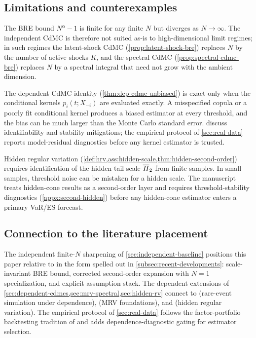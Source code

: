 \subsection{Limitations and counterexamples}
\label{subsec:limitations}

The BRE bound $N^\alpha-1$ is finite for any finite $N$ but diverges as
$N\to\infty$. The independent CdMC is therefore not suited as-is to
high-dimensional limit regimes; in such regimes the latent-shock CdMC
(\cref{prop:latent-shock-bre}) replaces $N$ by the number of active shocks
$K$, and the spectral CdMC (\cref{prop:spectral-cdmc-bre}) replaces $N$ by a
spectral integral that need not grow with the ambient dimension.

The dependent CdMC identity (\cref{thm:dep-cdmc-unbiased}) is exact only when
the conditional kernels $p_i(t;X_{-i})$ are evaluated exactly. A
misspecified copula or a poorly fit conditional kernel produces a biased
estimator at every threshold, and the bias can be much larger than the Monte
Carlo standard error. 
discuss identifiability and stability mitigations; the empirical protocol of
\cref{sec:real-data} reports model-residual diagnostics before any kernel
estimator is trusted.

Hidden regular variation
(\cref{def:hrv,ass:hidden-scale,thm:hidden-second-order}) requires
identification of the hidden tail scale $\overline{H}_2$ from finite samples. In
small samples, threshold noise can be mistaken for a hidden scale. The
manuscript treats hidden-cone results as a second-order layer and requires
threshold-stability diagnostics (\cref{appx:second-hidden}) before any
hidden-cone estimator enters a primary VaR/ES forecast.

\subsection{Connection to the literature placement}

The independent finite-$N$ sharpening of \cref{sec:independent-baseline}
positions this paper relative to \citet{PourbabaeeSolari2019} in the form
spelled out in \cref{subsec:recent-developments}: scale-invariant BRE bound,
corrected second-order expansion with $N=1$ specialization, and explicit
assumption stack. The dependent extensions of
\cref{sec:dependent-cdmcs,sec:mrv-spectral,sec:hidden-rv} connect to
\citet{AsmussenKroese2006,HartingerKortschak2009,BlanchetRojasNandayapa2011,ChengFuhPang2025}
(rare-event simulation under dependence),
\citet{HultLindskogMikoschSamorodnitsky2005,Resnick2007,SamorodnitskySun2016}
(MRV foundations), and
\citet{LedfordTawn1996,MaulikResnick2005,DasMitraResnick2013}
(hidden regular variation). The empirical protocol of \cref{sec:real-data}
follows the factor-portfolio backtesting tradition of
\citet{McNeilFreyEmbrechts2015,GlassermanHeidelbergerShahabuddin2002} and
adds dependence-diagnostic gating for estimator selection.

